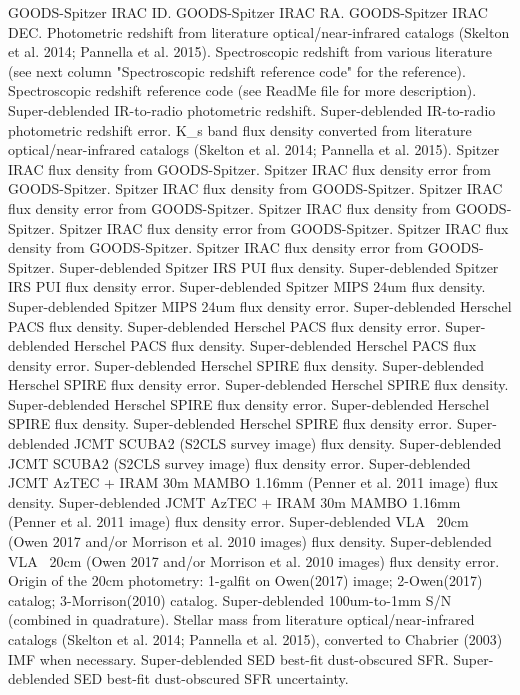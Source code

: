 GOODS-Spitzer IRAC ID.
GOODS-Spitzer IRAC RA.
GOODS-Spitzer IRAC DEC.
Photometric redshift from literature optical/near-infrared catalogs (Skelton et al. 2014; Pannella et al. 2015).
Spectroscopic redshift from various literature (see next column "Spectroscopic redshift reference code" for the reference).
Spectroscopic redshift reference code (see ReadMe file for more description).
Super-deblended IR-to-radio photometric redshift.
Super-deblended IR-to-radio photometric redshift error.
K_s band flux density converted from literature optical/near-infrared catalogs (Skelton et al. 2014; Pannella et al. 2015).
Spitzer IRAC flux density from GOODS-Spitzer.
Spitzer IRAC flux density error from GOODS-Spitzer.
Spitzer IRAC flux density from GOODS-Spitzer.
Spitzer IRAC flux density error from GOODS-Spitzer.
Spitzer IRAC flux density from GOODS-Spitzer.
Spitzer IRAC flux density error from GOODS-Spitzer.
Spitzer IRAC flux density from GOODS-Spitzer.
Spitzer IRAC flux density error from GOODS-Spitzer.
Super-deblended Spitzer IRS PUI flux density.
Super-deblended Spitzer IRS PUI flux density error.
Super-deblended Spitzer MIPS 24um flux density.
Super-deblended Spitzer MIPS 24um flux density error.
Super-deblended Herschel PACS flux density.
Super-deblended Herschel PACS flux density error.
Super-deblended Herschel PACS flux density.
Super-deblended Herschel PACS flux density error.
Super-deblended Herschel SPIRE flux density.
Super-deblended Herschel SPIRE flux density error.
Super-deblended Herschel SPIRE flux density.
Super-deblended Herschel SPIRE flux density error.
Super-deblended Herschel SPIRE flux density.
Super-deblended Herschel SPIRE flux density error.
Super-deblended JCMT SCUBA2 (S2CLS survey image) flux density.
Super-deblended JCMT SCUBA2 (S2CLS survey image) flux density error.
Super-deblended JCMT AzTEC + IRAM 30m MAMBO 1.16mm (Penner et al. 2011 image) flux density.
Super-deblended JCMT AzTEC + IRAM 30m MAMBO 1.16mm (Penner et al. 2011 image) flux density error.
Super-deblended VLA ~20cm (Owen 2017 and/or Morrison et al. 2010 images) flux density.
Super-deblended VLA ~20cm (Owen 2017 and/or Morrison et al. 2010 images) flux density error.
Origin of the 20cm photometry: 1-galfit on Owen(2017) image; 2-Owen(2017) catalog; 3-Morrison(2010) catalog.
Super-deblended 100um-to-1mm S/N (combined in quadrature).
Stellar mass from literature optical/near-infrared catalogs (Skelton et al. 2014; Pannella et al. 2015), converted to Chabrier (2003) IMF when necessary.
Super-deblended SED best-fit dust-obscured SFR.
Super-deblended SED best-fit dust-obscured SFR uncertainty.
